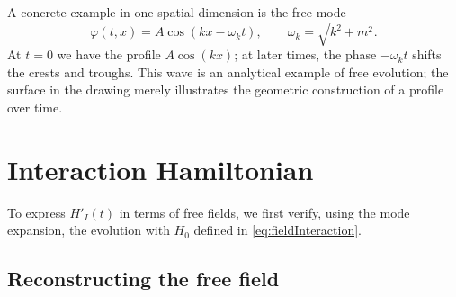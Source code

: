 \documentclass[11pt,letterpaper]{article}
\theoremstyle{definition}
\theoremstyle{definition}
\begin{document}
A concrete example in one spatial dimension is the free mode
\[
 \varphi(t,x)=A\cos(kx-\omega_k t),\qquad
 \omega_k=\sqrt{k^2+m^2}.
\]
At $t=0$ we have the profile $A\cos(kx)$; at later times,
the phase $-\omega_k t$ shifts the crests and troughs. This wave is an
analytical example of free evolution; the surface in the drawing merely
illustrates the geometric construction of a profile over time.

\section{Interaction Hamiltonian}

To express $H'_I(t)$ in terms of free fields, we first verify,
using the mode expansion, the evolution with $H_0$ defined in
\eqref{eq:fieldInteraction}.

\subsection{Reconstructing the free field}
\end{document}

